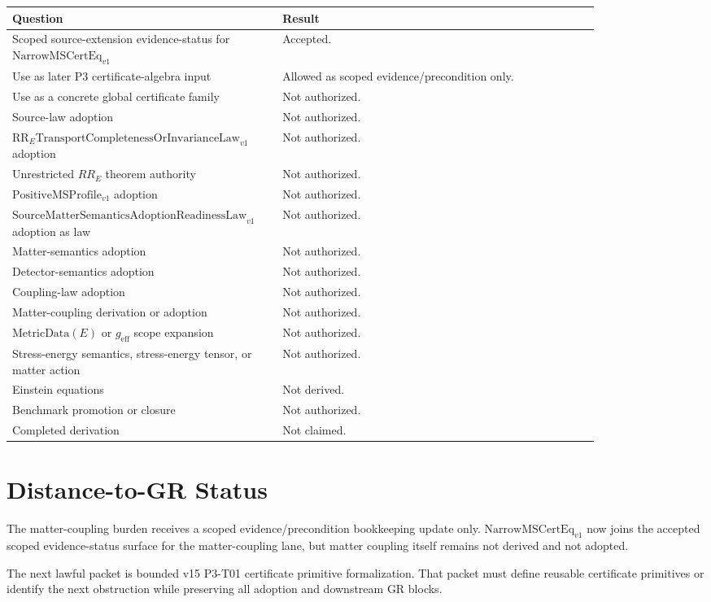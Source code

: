 \documentclass[11pt]{article}
\newcommand{\NarrowMSCertEq}{\mathrm{NarrowMSCertEq}_{v1}}
\newcommand{\RRELaw}{\mathrm{RR}_{E}\mathrm{TransportCompletenessOrInvarianceLaw}_{v1}}
\newcommand{\PositiveMSProfile}{\mathrm{PositiveMSProfile}_{v1}}
\newcommand{\SMSAR}{\mathrm{SourceMatterSemanticsAdoptionReadinessLaw}_{v1}}
\newcommand{\MetricData}{\mathrm{MetricData}}
\newcommand{\geff}{g_{\mathrm{eff}}}
\begin{document}
\begin{longtable}{p{0.34\linewidth}p{0.50\linewidth}}
\toprule
Question & Result \\
\midrule
Scoped source-extension evidence-status for \(\NarrowMSCertEq\) & Accepted. \\
Use as later P3 certificate-algebra input & Allowed as scoped
evidence/precondition only. \\
Use as a concrete global certificate family & Not authorized. \\
Source-law adoption & Not authorized. \\
\(\RRELaw\) adoption & Not authorized. \\
Unrestricted \(RR_E\) theorem authority & Not authorized. \\
\(\PositiveMSProfile\) adoption & Not authorized. \\
\(\SMSAR\) adoption as law & Not authorized. \\
Matter-semantics adoption & Not authorized. \\
Detector-semantics adoption & Not authorized. \\
Coupling-law adoption & Not authorized. \\
Matter-coupling derivation or adoption & Not authorized. \\
\(\MetricData(E)\) or \(\geff\) scope expansion & Not authorized. \\
Stress-energy semantics, stress-energy tensor, or matter action & Not
authorized. \\
Einstein equations & Not derived. \\
Benchmark promotion or closure & Not authorized. \\
Completed derivation & Not claimed. \\
\bottomrule
\end{longtable}

\section{Distance-to-GR Status}

The matter-coupling burden receives a scoped evidence/precondition bookkeeping
update only. \(\NarrowMSCertEq\) now joins the accepted scoped evidence-status
surface for the matter-coupling lane, but matter coupling itself remains not
derived and not adopted.

The next lawful packet is bounded v15 P3-T01 certificate primitive
formalization. That packet must define reusable certificate primitives or
identify the next obstruction while preserving all adoption and downstream GR
blocks.
\end{document}
